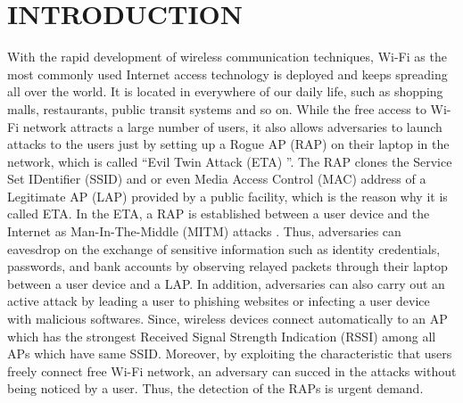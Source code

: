 \documentclass[conference]{IEEEtran}
\begin{document}
\section{INTRODUCTION}
With the rapid development of wireless communication techniques, Wi-Fi as the most commonly used Internet access technology is deployed and keeps spreading all over the world\cite{bg-evi}.
It is located in everywhere of our daily life, such as shopping malls, restaurants, public transit systems and so on.
While the free access to Wi-Fi network attracts a large number of users, it also allows adversaries to launch attacks to the users just by setting up a Rogue AP (RAP) on their laptop in the network, which is called ``Evil Twin Attack (ETA) ''\cite{laptop-evi}.
The RAP clones the Service Set IDentifier (SSID) and or even Media Access Control (MAC) address of a Legitimate AP (LAP) provided by a public facility, which is the reason why it is called ETA.
In the ETA, a RAP is established between a user device and the Internet as Man-In-The-Middle (MITM) attacks \cite{spoof-evi}.
Thus, adversaries can eavesdrop on the exchange of sensitive information such as identity credentials, passwords, and bank accounts by observing relayed packets through their laptop between a user device and a LAP.
In addition, adversaries can also carry out an active attack by leading a user to phishing websites or infecting a user device with malicious softwares\cite{research}.
Since, wireless devices connect automatically to an AP which has the strongest Received Signal Strength Indication (RSSI) among all APs which have same SSID.
Moreover, by exploiting the characteristic that users freely connect free Wi-Fi network,  an adversary can succed in the attacks without being noticed by a user.
Thus, the detection of the RAPs is urgent demand.
\end{document}
